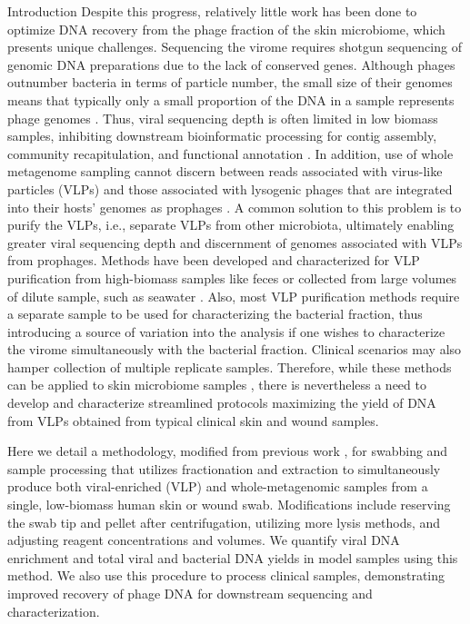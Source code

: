 \documentclass[oneside,12pt,final]{sty/ucthesis-CA2012}
\begin{document}
\begin{mainmatter}
\begin{section}{Introduction}
Despite this progress, relatively little work has been done to optimize DNA recovery from the phage fraction of the skin microbiome, which presents unique challenges. Sequencing the virome requires shotgun sequencing of genomic DNA preparations due to the lack of conserved genes. Although phages outnumber bacteria in terms of particle number, the small size of their genomes means that typically only a small proportion of the DNA in a sample represents phage genomes \cite{RN63}. Thus, viral sequencing depth is often limited in low biomass samples, inhibiting downstream bioinformatic processing for contig assembly, community recapitulation, and functional annotation \cite{RN64}. In addition, use of whole metagenome sampling cannot discern between reads associated with virus-like particles (VLPs) and those associated with lysogenic phages that are integrated into their hosts’ genomes as prophages \cite{RN66}. A common solution to this problem is to purify the VLPs, i.e., separate VLPs from other microbiota, ultimately enabling greater viral sequencing depth and discernment of genomes associated with VLPs from prophages. Methods have been developed and characterized for VLP purification from high-biomass samples like feces \cite{RN66} or collected from large volumes of dilute sample, such as seawater \cite{RN67}. Also, most VLP purification methods require a separate sample to be used for characterizing the bacterial fraction, thus introducing a source of variation into the analysis if one wishes to characterize the virome simultaneously with the bacterial fraction. Clinical scenarios may also hamper collection of multiple replicate samples. Therefore, while these methods can be applied to skin microbiome samples \cite{RN56}, there is nevertheless a need to develop and characterize streamlined protocols maximizing the yield of DNA from VLPs obtained from typical clinical skin and wound samples.

Here we detail a methodology, modified from previous work \cite{RN56, RN67}, for swabbing and sample processing that utilizes fractionation and extraction to simultaneously produce both viral-enriched (VLP) and whole-metagenomic samples from a single, low-biomass human skin or wound swab. Modifications include reserving the swab tip and pellet after centrifugation, utilizing more lysis methods, and adjusting reagent concentrations and volumes. We quantify viral DNA enrichment and total viral and bacterial DNA yields in model samples using this method. We also use this procedure to process clinical samples, demonstrating improved recovery of phage DNA for downstream sequencing and characterization.


\end{section}
\end{mainmatter}
\end{document}
